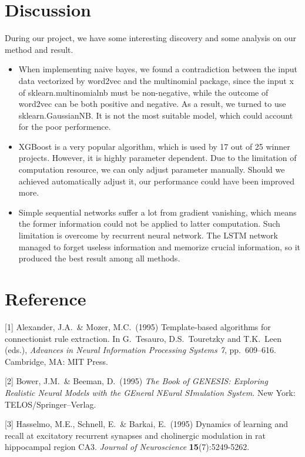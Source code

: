 \documentclass{article}
\begin{document}
\section{Discussion}
During our project, we have some interesting discovery and some analysis on our method and result.
\begin{itemize}
	\item When implementing naive bayes, we found a contradiction between the input data vectorized by word2vec and the multinomial package, since the input x of sklearn.multinomialnb must be non-negative, while the outcome of word2vec can be both positive and negative. As a result, we turned to use sklearn.GaussianNB. It is not the most suitable model, which could account for the poor performence.
	\item XGBoost is a very popular algorithm, which is used by 17 out of 25 winner projects. However, it is highly parameter dependent. Due to the limitation of computation resource, we can only adjust parameter manually. Should we achieved automatically adjust it, our performance could have been improved more.
	\item Simple sequential networks suffer a lot from gradient vanishing, which means the former information could not be applied to latter computation. Such limitation is overcome by recurrent neural network. The LSTM network managed to forget useless information and memorize crucial information, so it produced the best result among all methods.
\end{itemize}




\section{Reference}


\small

[1] Alexander, J.A.\ \& Mozer, M.C.\ (1995) Template-based algorithms for
connectionist rule extraction. In G.\ Tesauro, D.S.\ Touretzky and T.K.\ Leen
(eds.), {\it Advances in Neural Information Processing Systems 7},
pp.\ 609--616. Cambridge, MA: MIT Press.

[2] Bower, J.M.\ \& Beeman, D.\ (1995) {\it The Book of GENESIS: Exploring
  Realistic Neural Models with the GEneral NEural SImulation System.}  New York:
TELOS/Springer--Verlag.

[3] Hasselmo, M.E., Schnell, E.\ \& Barkai, E.\ (1995) Dynamics of learning and
recall at excitatory recurrent synapses and cholinergic modulation in rat
hippocampal region CA3. {\it Journal of Neuroscience} {\bf 15}(7):5249-5262.
\end{document}
